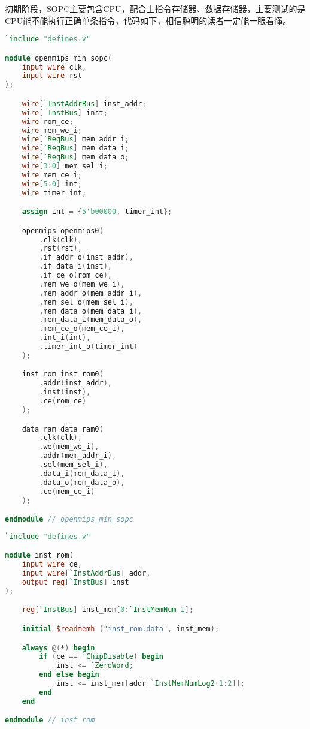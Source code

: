 初期阶段，SOPC主要包含CPU，配合上指令存储器、数据存储器，主要测试的是CPU能不能执行正确单条指令，代码如下，相信聪明的读者一定能一眼看懂。

\begin{lstlisting}[language=verilog]
`include "defines.v"

module openmips_min_sopc(
    input wire clk,
    input wire rst
);

    wire[`InstAddrBus] inst_addr;
    wire[`InstBus] inst;
    wire rom_ce;
    wire mem_we_i;
    wire[`RegBus] mem_addr_i;
    wire[`RegBus] mem_data_i;
    wire[`RegBus] mem_data_o;
    wire[3:0] mem_sel_i;
    wire mem_ce_i;
    wire[5:0] int;
    wire timer_int;

    assign int = {5'b00000, timer_int};

    openmips openmips0(
        .clk(clk),
        .rst(rst),
        .if_addr_o(inst_addr),
        .if_data_i(inst),
        .if_ce_o(rom_ce),
        .mem_we_o(mem_we_i),
        .mem_addr_o(mem_addr_i),
        .mem_sel_o(mem_sel_i),
        .mem_data_o(mem_data_i),
        .mem_data_i(mem_data_o),
        .mem_ce_o(mem_ce_i),
        .int_i(int),
        .timer_int_o(timer_int)
    );

    inst_rom inst_rom0(
        .addr(inst_addr),
        .inst(inst),
        .ce(rom_ce)
    );

    data_ram data_ram0(
        .clk(clk),
        .we(mem_we_i),
        .addr(mem_addr_i),
        .sel(mem_sel_i),
        .data_i(mem_data_i),
        .data_o(mem_data_o),
        .ce(mem_ce_i)
    );

endmodule // openmips_min_sopc
\end{lstlisting}

\begin{lstlisting}[language=verilog]
`include "defines.v"

module inst_rom(
    input wire ce,
    input wire[`InstAddrBus] addr,
    output reg[`InstBus] inst
);

    reg[`InstBus] inst_mem[0:`InstMemNum-1];

    initial $readmemh ("inst_rom.data", inst_mem);

    always @(*) begin
        if (ce == `ChipDisable) begin
            inst <= `ZeroWord; 
        end else begin
            inst <= inst_mem[addr[`InstMemNumLog2+1:2]];
        end
    end

endmodule // inst_rom
\end{lstlisting}

